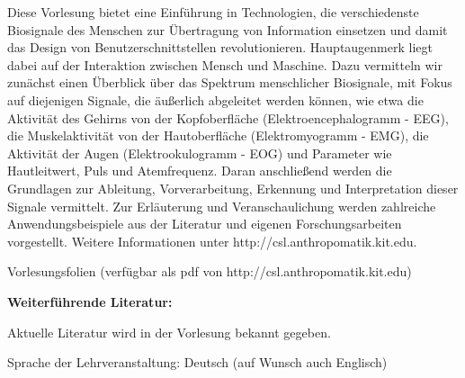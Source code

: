 \begin{course}
\begin{learningoutcomes}
\end{learningoutcomes}

\begin{content}
Diese Vorlesung bietet eine Einführung in Technologien, die verschiedenste Biosignale des Menschen zur Übertragung von Information einsetzen und damit das Design von Benutzerschnittstellen revolutionieren. Hauptaugenmerk liegt dabei auf der Interaktion zwischen Mensch und Maschine. Dazu vermitteln wir zunächst einen Überblick über das Spektrum menschlicher Biosignale, mit Fokus auf diejenigen Signale, die äußerlich abgeleitet werden können, wie etwa die Aktivität des Gehirns von der Kopfoberfläche (Elektroencephalogramm - EEG), die Muskelaktivität von der Hautoberfläche (Elektromyogramm - EMG), die Aktivität der Augen (Elektrookulogramm - EOG) und Parameter wie Hautleitwert, Puls und Atemfrequenz. Daran anschließend werden die Grundlagen zur Ableitung, Vorverarbeitung, Erkennung und Interpretation dieser Signale vermittelt. Zur Erläuterung und Veranschaulichung werden zahlreiche Anwendungsbeispiele aus der Literatur und eigenen Forschungsarbeiten vorgestellt.\newline
Weitere Informationen unter http://csl.anthropomatik.kit.edu.


\end{content}

\begin{media}Vorlesungsfolien (verfügbar als pdf von http://csl.anthropomatik.kit.edu)

\end{media}

\begin{literature}\textbf{Weiterführende Literatur:}

 

Aktuelle Literatur wird in der Vorlesung bekannt gegeben.

\end{literature}

\begin{remarks}Sprache der Lehrveranstaltung: Deutsch (auf Wunsch auch Englisch)

\end{remarks}

\end{course}